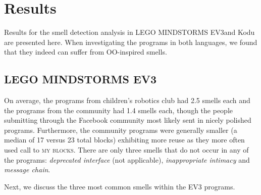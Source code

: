 \documentclass[conference]{IEEEtran}
\newcommand{\ms}{LEGO MINDSTORMS EV3}
\newcommand{\mbs}{\textsc{my blocks}}
\begin{document}
\section{Results}
\label{sec:results}
Results for the smell detection analysis in \ms and Kodu are presented here. When investigating the programs in both languages, we found that they indeed can suffer from OO-inspired smells. 



\subsection{\ms}
On average, the programs from children's robotics club had 2.5 smells each and the programs from the community  had 1.4 smells each, though  the people submitting through the Facebook community most likely sent in nicely polished programs. Furthermore, the community programs were generally smaller (a median of 17 versus 23 total blocks) exhibiting more reuse as they more often used call to \mbs. There are only three smells that do not occur in any of the programs: \emph{deprecated interface} (not applicable), \emph{inappropriate intimacy} and \emph{message chain}.

Next, we discuss the three most common smells within the EV3 programs. 

\end{document}
